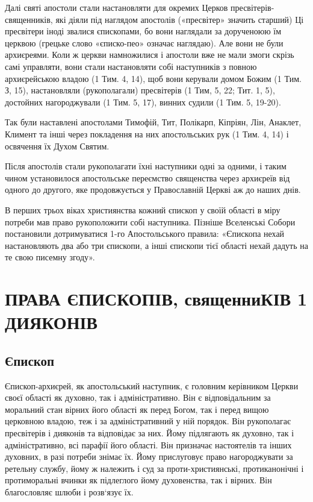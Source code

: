 \documentclass[main.tex]{subfiles}
\begin{document}
Далі святі апостоли стали настановляти для окремих Церков пресвітерів-священників, які діяли під наглядом апостолів («пресвітер» значить старший) Ці пресвітери іноді звалися єпископами, бо вони наглядали за дорученоюю їм церквою (грецьке слово «єписко-пео» означає наглядаю). Але вони не були архиєреями. Коли ж церкви намножилися і апостоли вже не мали змоги скрізь самі управляти, вони стали настановляти собі наступників з повною архиєрейською владою (1 Тим. 4, 14), щоб вони керували домом Божим (1 Тим. З, 15), настановляли (рукополагали) пресвітерів (1 Тим, 5, 22; Тит. 1, 5), достойних нагороджували (1 Тим. 5, 17), винних судили (1 Тим. 5, 19-20).

Так були наставлені апостолами Тимофій, Тит, Полікарп, Кіпріян, Лін, Анаклет, Климент та інші через покладення на них апостольських рук (1 Тим. 4, 14) і освячення їх Духом Святим.

Після апостолів стали рукополагати їхні наступники одні за одними, і таким чином установилося апостольське переємство священства через архиєреїв від одного до другого, яке продовжується у Православній Церкві аж до наших днів.

В перших трьох віках християнства кожний єпископ у своїй області в міру потреби мав право рукоположити собі наступника. Пізніше Вселенські Собори постановили дотримуватися 1-го Апостольського правила: «Єпископа нехай настановляють два або три єпископи, а інші єпископи тієї області нехай дадуть на те свою писемну згоду».

\section{ПРАВА ЄПИСКОПІВ, священниКІВ 1 ДИЯКОНІВ}

\subsection{Єпископ}

Єпископ-архиєрей, як апостольський наступник, є головним керівником Церкви своєї області як духовно, так і адміністративно. Він є відповідальним за моральний стан вірних його області як перед Богом, так і перед вищою церковною владою, теж і за адміністративний у ній порядок. Він рукополагає пресвітерів і дияконів та відповідає за них. Йому підлягають як духовно, так і адміністративно, всі парафії його області. Він призначає настоятелів та інших духовних, в разі потреби знімає їх. Йому прислуговує право нагороджувати за ретельну службу, йому ж належить і суд за проти-християнські, протиканонічні і протиморальні вчинки як підлеглого йому духовенства, так і вірних. Він благословляє шлюби і розв`язує їх.
\end{document}
